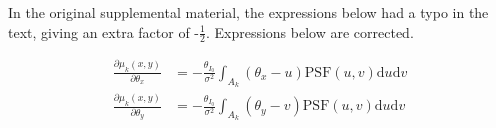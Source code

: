\documentclass[10pt]{article}
\begin{document}
In the original supplemental material, the expressions below had a typo in the text, giving an extra factor of -$\frac{1}{2}$. Expressions below are corrected. 

\begin{subequations}
\label{PartialInt}
\begin{align}
\label{PartialInt:a}\frac{\partial \mu_k(x,y)}{\partial \theta_x}&=-\frac{\theta_{I_0}}{\sigma^2}\int_{A_k}(\theta_x-u) \mathrm{PSF}(u,v) \mathrm{d}u\mathrm{d}v\tag{10a}\\
\label{PartialInt:b}\frac{\partial \mu_k(x,y)}{\partial \theta_y}&=-\frac{\theta_{I_0}}{\sigma^2}\int_{A_k} (\theta_y-v) \mathrm{PSF}(u,v) \mathrm{d}u\mathrm{d}v\tag{10b}
\end{align}
\end{subequations}
\end{document}

